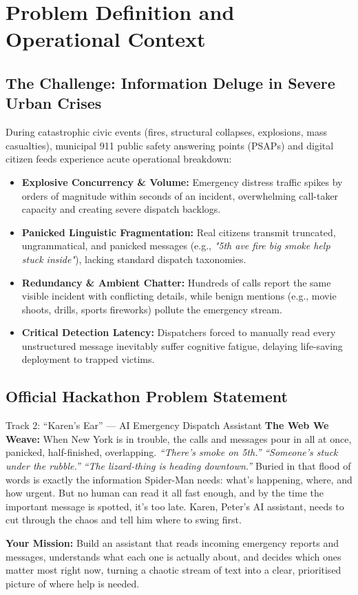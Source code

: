 \documentclass[10pt,a4paper]{article}
\begin{document}
\section{Problem Definition and Operational Context}
\subsection{The Challenge: Information Deluge in Severe Urban Crises}
During catastrophic civic events (fires, structural collapses, explosions, mass casualties), municipal 911 public safety answering points (PSAPs) and digital citizen feeds experience acute operational breakdown:
\begin{itemize}
  \item \textbf{Explosive Concurrency \& Volume:} Emergency distress traffic spikes by orders of magnitude within seconds of an incident, overwhelming call-taker capacity and creating severe dispatch backlogs.
  \item \textbf{Panicked Linguistic Fragmentation:} Real citizens transmit truncated, ungrammatical, and panicked messages (e.g., \emph{"5th ave fire big smoke help stuck inside"}), lacking standard dispatch taxonomies.
  \item \textbf{Redundancy \& Ambient Chatter:} Hundreds of calls report the same visible incident with conflicting details, while benign mentions (e.g., movie shoots, drills, sports fireworks) pollute the emergency stream.
  \item \textbf{Critical Detection Latency:} Dispatchers forced to manually read every unstructured message inevitably suffer cognitive fatigue, delaying life-saving deployment to trapped victims.
\end{itemize}

\subsection{Official Hackathon Problem Statement}
\begin{calloutbox}{Track 2: ``Karen's Ear'' --- AI Emergency Dispatch Assistant}
\small
\textbf{The Web We Weave:} When New York is in trouble, the calls and messages pour in all at once, panicked, half-finished, overlapping. \emph{``There's smoke on 5th.''} \emph{``Someone's stuck under the rubble.''} \emph{``The lizard-thing is heading downtown.''} Buried in that flood of words is exactly the information Spider-Man needs: what's happening, where, and how urgent. But no human can read it all fast enough, and by the time the important message is spotted, it's too late. Karen, Peter's AI assistant, needs to cut through the chaos and tell him where to swing first.

\vspace{0.10cm}
\textbf{Your Mission:} Build an assistant that reads incoming emergency reports and messages, understands what each one is actually about, and decides which ones matter most right now, turning a chaotic stream of text into a clear, prioritised picture of where help is needed.
\end{calloutbox}
\end{document}
